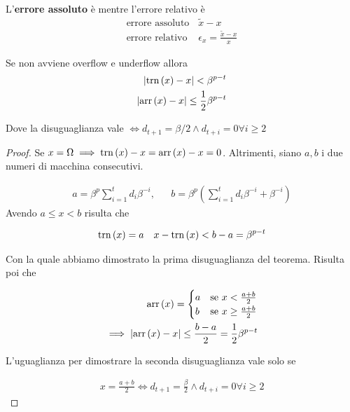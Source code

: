     L'\textbf{errore assoluto} è  mentre l'errore relativo è
    \begin{eqnarray*}
        \text{errore assoluto} & \tilde{x} - x \\
        \text{errore relativo } & \epsilon_x = \frac{\tilde{x} - x}{x}
    \end{eqnarray*}


\begin{thm}
    Se non avviene overflow e underflow allora
    \begin{eqnarray*}
        \lvert\text{trn}\left(x\right) - x\rvert < \beta^{p-t}  \\
        \lvert\text{arr}\left(x\right) - x\rvert \leq \frac{1}{2} \beta^{p-t}
    \end{eqnarray*}

Dove la disuguaglianza vale $\iff d_{t+1} = \beta/2 \land d_{t+i} = 0 \forall i \geq 2$
\end{thm}

\begin{proof}
    Se $x = \Omega \implies \text{trn}\left(x\right) - x = \text{arr}\left(x\right) - x = 0$. Altrimenti, siano
    $a,b$ i due numeri di macchina consecutivi.

    \begin{eqnarray*}
        a = \beta^p \sum_{i=1}^{t} d_i \beta^{-i}, & & b = \beta^p \left( \sum_{i=1}^{t} d_i \beta^{-i} + \beta^{-i} \right)
    \end{eqnarray*}
    Avendo $a \leq x < b$ risulta che

    \begin{eqnarray*}
        \text{trn}\left(x\right) = a & & x - \text{trn}\left(x\right) < b - a = \beta^{p -t}
    \end{eqnarray*}

    Con la quale abbiamo dimostrato la prima disuguaglianza del teorema. Risulta poi che

    \begin{eqnarray*}
\text{arr}\left(x\right) = \begin{cases}
    a & \text{se } x < \frac{a+b}{2} \\
    b & \text{se } x \geq \frac{a+b}{2}
\end{cases} \\
\implies \lvert\text{arr}\left(x\right) - x\rvert \leq \frac{b - a}{2} = \frac{1}{2} \beta^{p - t}
    \end{eqnarray*}

    L'uguaglianza per dimostrare la seconda disuguaglianza vale solo se

    \begin{eqnarray*}
        x = \frac{a + b}{2} \iff d_{t+1} = \frac{\beta}{2} \land d_{t+i} = 0 \forall i \geq 2
    \end{eqnarray*}
\end{proof}


